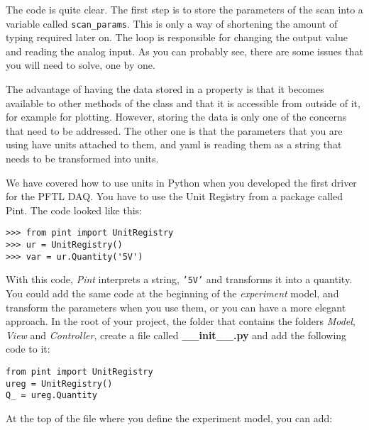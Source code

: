{The code is quite clear. The first step is to store the parameters of
the scan into a variable called \texttt{scan_params}. This is only a
way of shortening the amount of typing required later on. The loop is
responsible for changing the output value and reading the analog input.
As you can probably see, there are some issues that you will need to
solve, one by one.


The advantage of having the data stored in a property is that it
becomes available to other methods of the class and that it is
accessible from outside of it, for example for plotting. However,
storing the data is only one of the concerns that need to be addressed.
The other one is that the parameters that you are using have units
attached to them, and yaml is reading them as a string that needs to be
transformed into units.

We have covered how to use units in Python when you developed the first
driver for the {PFTL} {DAQ}. You have to use the Unit Registry from a
package called Pint. The code looked like this:

\begin{verbatim}
>>> from pint import UnitRegistry
>>> ur = UnitRegistry()
>>> var = ur.Quantity('5V')
\end{verbatim}

With this code, \emph{Pint} interprets a string,
\texttt{'5V'} and transforms it into a
quantity. You could add the same code at the beginning of the
\emph{experiment} model, and transform the parameters when you use them,
or you can have a more elegant approach. In the root of your project,
the folder that contains the folders \emph{Model}, \emph{View} and
\emph{Controller}, create a file called \textbf{\_\_init\_\_.py} and add
the following code to it:

\begin{verbatim}
from pint import UnitRegistry
ureg = UnitRegistry()
Q_ = ureg.Quantity
\end{verbatim}

At the top of the file where you define the experiment model, you
can add:

}
